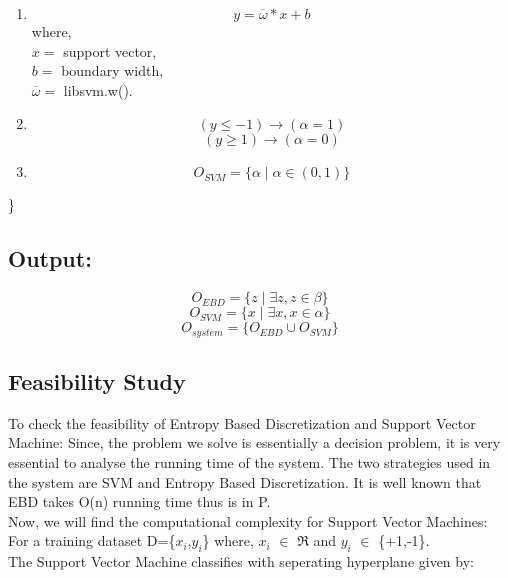 \documentclass[12pt,a4paper,final]{report}
\DeclareRobustCommand{\gobblefive}[5]{}
\newcommand*{\SkipTocEntry}{\addtocontents{toc}{\gobblefive}}
\begin{document}
{{{{\begin{enumerate}
\item
\begin{equation}
y = \overline{\omega} * x + b
\end{equation}
where, \\ $x =$ support vector, \\ $b =$ boundary width, \\ $\overline{\omega} =$ libsvm.w().

\item
\begin{equation}
(y \leq -1) \rightarrow (\alpha = 1)
\end{equation}
\begin{equation}
(y \geq 1) \rightarrow (\alpha = 0)
\end{equation}

\item
\begin{equation}
O_{SVM} = \lbrace \alpha \mid \alpha \in (0, 1) \rbrace
\end{equation}

\end{enumerate}

$\\ \rbrace$

\SkipTocEntry\subsection{Output:}

\begin{equation}
O_{EBD} = \lbrace z \mid \exists z, z \in \beta \rbrace
\end{equation}
\begin{equation}
O_{SVM} = \lbrace x \mid \exists x, x \in \alpha \rbrace
\end{equation}
\begin{equation}
O_{system} = \lbrace O_{EBD} \cup O_{SVM} \rbrace
\end{equation}

\SkipTocEntry\subsection{Feasibility Study}
To check the feasibility of Entropy Based Discretization and Support Vector Machine:
\newline Since, the problem we solve is essentially a decision problem, it is very essential to analyse the running time of the system. The two strategies used in the system are SVM and Entropy Based Discretization. It is well known that EBD takes O(n) running time thus is in P.\\
\newline
Now, we will find the computational complexity for Support Vector Machines:\\
For a training dataset D=\{$x_i$,$y_i$\} where, $x_i$ $\in$ $\Re$ and $y_i$ $\in$ \{+1,-1\}.\\
The Support Vector Machine classifies with seperating hyperplane given by:\\

}}}}
\end{document}
